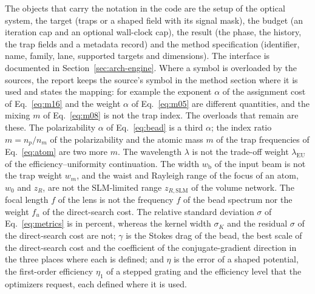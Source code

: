 The objects that carry the notation in the code are the setup of the optical system, the target (traps or a shaped field with its signal mask), the budget (an iteration cap and an optional wall-clock cap), the result (the phase, the history, the trap fields and a metadata record) and the method specification (identifier, name, family, lane, supported targets and dimensions). The interface is documented in Section~\ref{sec:arch-engine}. Where a symbol is overloaded by the sources, the report keeps the source's symbol in the method section where it is used and states the mapping: for example the exponent $\alpha$ of the assignment cost of Eq.~\eqref{eq:m16} and the weight $\alpha$ of Eq.~\eqref{eq:m05} are different quantities, and the mixing $m$ of Eq.~\eqref{eq:m08} is not the trap index. The overloads that remain are these. The polarizability $\alpha$ of Eq.~\eqref{eq:bead} is a third $\alpha$; the index ratio $m=n_p/n_m$ of the polarizability and the atomic mass $m$ of the trap frequencies of Eq.~\eqref{eq:atom} are two more $m$. The wavelength $\lambda$ is not the trade-off weight $\lambda_{\mathrm{EU}}$ of the efficiency--uniformity continuation. The width $w_{\mathrm b}$ of the input beam is not the trap weight $w_m$, and the waist and Rayleigh range of the focus of an atom, $w_0$ and $z_R$, are not the SLM-limited range $z_{R,\mathrm{SLM}}$ of the volume network. The focal length $f$ of the lens is not the frequency $f$ of the bead spectrum nor the weight $f_u$ of the direct-search cost. The relative standard deviation $\sigma$ of Eq.~\eqref{eq:metrics} is in percent, whereas the kernel width $\sigma_K$ and the residual $\sigma$ of the direct-search cost are not; $\gamma$ is the Stokes drag of the bead, the best scale of the direct-search cost and the coefficient of the conjugate-gradient direction in the three places where each is defined; and $\eta$ is the error of a shaped potential, the first-order efficiency $\eta_1$ of a stepped grating and the efficiency level that the optimizers request, each defined where it is used.
